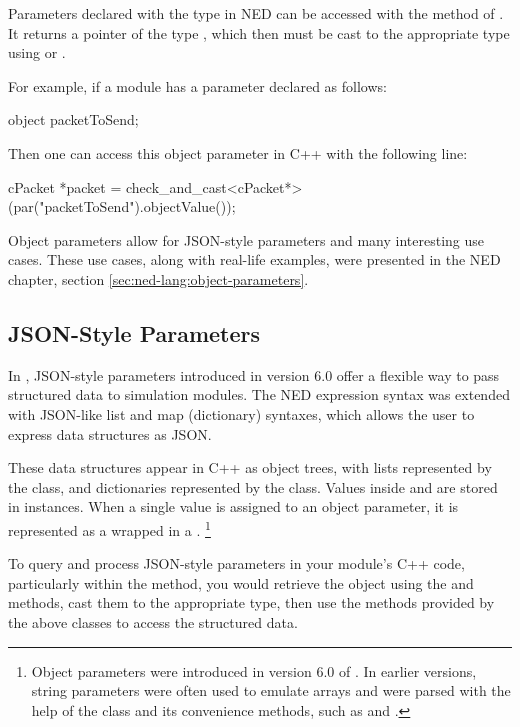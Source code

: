 Parameters declared with the type  in NED can be accessed with
the  method of . It returns a pointer of the
type , which then must be cast to the appropriate type using
 or .

For example, if a module has a parameter declared as follows:
\begin{ned}
  object packetToSend;
\end{ned}

Then one can access this object parameter in C++ with the following line:

\begin{cpp}
cPacket *packet = check_and_cast<cPacket*>(par("packetToSend").objectValue());
\end{cpp}

Object parameters allow for JSON-style parameters and many interesting use
cases. These use cases, along with real-life examples, were presented in the NED
chapter, section \ref{sec:ned-lang:object-parameters}.


\subsection{JSON-Style Parameters}
\label{sec:simple-modules:json-style-parameters}

In {\omnetpp}, JSON-style parameters introduced in version 6.0 offer a flexible
way to pass structured data to simulation modules. The NED expression syntax was
extended with JSON-like list and map (dictionary) syntaxes, which allows the
user to express data structures as JSON.

These data structures appear in C++ as object trees, with lists represented by
the  class, and dictionaries represented by the
 class. Values inside  and
 are stored in  instances. When a single value
is assigned to an object parameter, it is represented as a 
wrapped in a . \footnote{Object parameters were introduced
in version 6.0 of {\opp}. In earlier versions, string parameters were often used
to emulate arrays and were parsed with the help of the 
class and its convenience methods, such as  and
.}

To query and process JSON-style parameters in your module's C++ code,
particularly within the  method, you would retrieve the object
using the  and  methods, cast them to the
appropriate type, then use the methods provided by the above classes to access
the structured data.

